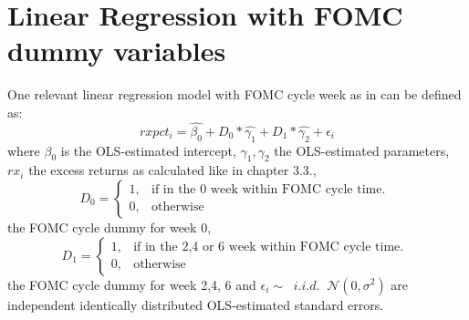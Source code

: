 \newpage

\section{Linear Regression with FOMC dummy variables}

One relevant linear regression model with FOMC cycle week as in \parencite{cieslak_stock_2019} can be defined as:
\begin{equation}
	rxpct_{i}=\hat{\beta_{0}}+D_0*\hat{\gamma_{1}}+D_1*\hat{\gamma_{2}}+\epsilon_i
\end{equation}
where
$ {\beta_{0}} $ is the OLS-estimated intercept,
$ {\gamma_{1}, \gamma_{2}} $ the OLS-estimated parameters,
${ rx_{i}} $ the excess returns as calculated like in chapter 3.3., 
\begin{equation}
    D_0=
    \begin{cases}
      1, & \text{if in the 0 week within FOMC cycle time. }\\
      0, & \text{otherwise}
    \end{cases}
\end{equation}
the FOMC cycle dummy for week 0, 
\begin{equation}
    D_1=
    \begin{cases}
      1, & \text{if in the 2,4 or 6 week within FOMC cycle time. } \\
      0, & \text{otherwise}
    \end{cases}
\end{equation}
the FOMC cycle dummy for week 2,4, 6 and
$ {
	\epsilon_i \sim \; \; i.i.d. \; \; \mathcal{N}\left(0, \sigma^2 \right)
} $
are independent identically distributed OLS-estimated standard errors. 


\newpage


